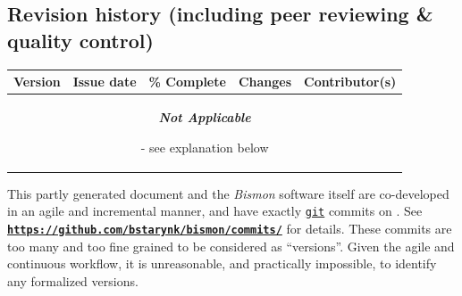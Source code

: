 \documentclass[11pt,a4paper,svgnames]{article}
\newcommand{\bmurl}[1]{{\href{#1}{\texttt{\textbf{#1}}}}}
\begin{document}
\begin{titlepage}
\begin{center}
{\begin{minipage}{0.85\textwidth}
    \medskip
    
    \end{minipage}
  }
  \end{center}
  
  
  \subsection*{Revision history (including peer reviewing \& quality control)}
  
  \begin{tabular}{|p{}|p{}|p{}|l|l|}
    \hline
    \textbf{Version} & \textbf{Issue date} & \textbf{\% Complete} & \textbf{Changes} & \textbf{Contributor(s)} \\
    \hline
    \multicolumn{5}{|c|}{\parbox[c][1cm][c]{0.5\textwidth}{\Large \textbf{\emph{Not Applicable}}} - see explanation below} \\
    \hline
  \end{tabular}

  \medskip
  
  
This partly generated document and the \emph{Bismon} software itself
are co-developed in an agile and incremental manner, and have exactly {\bmgitnumbercommits} \href{http://git-scm.com/}{\texttt{git}}
commits on \textit{\bmdoctimestamp}. See
\bmurl{https://github.com/bstarynk/bismon/commits/} for details. These commits are too many and too fine grained to be considered as ``versions''. Given the agile and continuous workflow, it is unreasonable, and practically impossible, to identify any formalized versions.


\end{titlepage}
\end{document}
